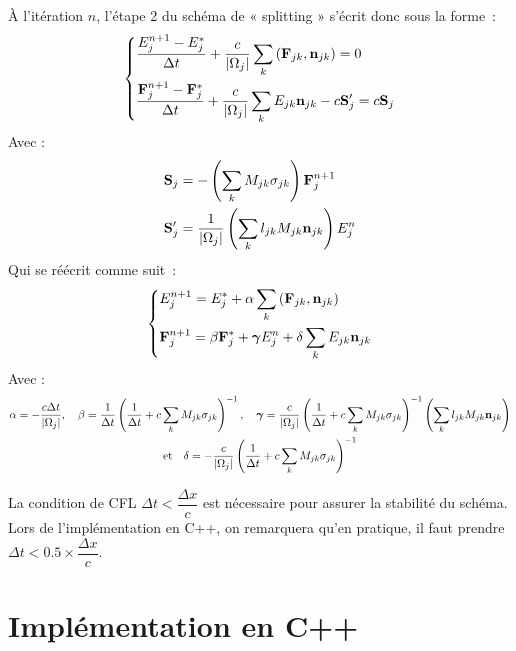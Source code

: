 À l'itération $n$, l'étape 2 du schéma de « splitting » s'écrit donc sous la forme :
\begin{equation*} 
    \begin{dcases}
    \frac{E_j^{n+1} - E_j^*}{\Delta t} + \frac{c}{\left| \Omega_j \right|} \sum_k \left( \mathbf{F}_{jk}, \mathbf{n}_{jk} \right) = 0 \\
    \frac{\mathbf{F}_j^{n+1} - \mathbf{F}_j^*}{\Delta t} + \frac{c}{\left| \Omega_j \right|} \sum_k E_{jk} \mathbf{n}_{jk} -c \mathbf{S}_j^{\prime} = c \mathbf{S}_j 
    \end{dcases}   
\end{equation*}
Avec :
\begin{align*}
    \mathbf{S}_j &= - \left( \sum_k M_{jk} \sigma_{jk} \right) \mathbf{F}_{j}^{n+1} \\
    \mathbf{S}_j^{\prime} &= \frac{1}{\left| \Omega_j \right|} \left( \sum_k l_{jk} M_{jk} \mathbf{n}_{jk} \right) E_j^n \\
\end{align*}
Qui se réécrit comme suit :
\begingroup
\Large
\begin{equation} 
    \begin{dcases}
    E_j^{n+1} = E_j^* + \alpha \sum_k \left( \mathbf{F}_{jk}, \mathbf{n}_{jk} \right) \\
    \mathbf{F}_j^{n+1} = \beta \mathbf{F}_j^* + \bm{\gamma} E_j^n + \delta \sum_k E_{jk} \mathbf{n}_{jk}
    \end{dcases}   
\label{eqn:Step2}
\end{equation}
\endgroup
Avec :
\begin{gather*} 
\alpha = -\frac{c \Delta t}{\left| \Omega_j \right|}, \quad 
\beta = \frac{1}{\Delta t} \left( \frac{1}{\Delta t} + c \sum_k M_{jk} \sigma_{jk} \right)^{-1}, \quad 
\bm{\gamma} = \frac{c}{\left| \Omega_j \right|} \left( \frac{1}{\Delta t} + c \sum_k M_{jk} \sigma_{jk} \right)^{-1} \left( \sum_k l_{jk} M_{jk} \mathbf{n}_{jk} \right) \\
\text{et} \quad \delta = -\frac{c}{\left| \Omega_j \right|} \left( \frac{1}{\Delta t} + c \sum_k M_{jk} \sigma_{jk} \right)^{-1}
\end{gather*}

La condition de CFL $\Delta t < \dfrac{\Delta x}{c}$ est nécessaire pour assurer la stabilité du schéma. Lors de l'implémentation en C++, on remarquera qu'en pratique, il faut prendre $\Delta t < 0.5 \times \dfrac{\Delta x}{c}.$ 

\section{Implémentation en C++}

